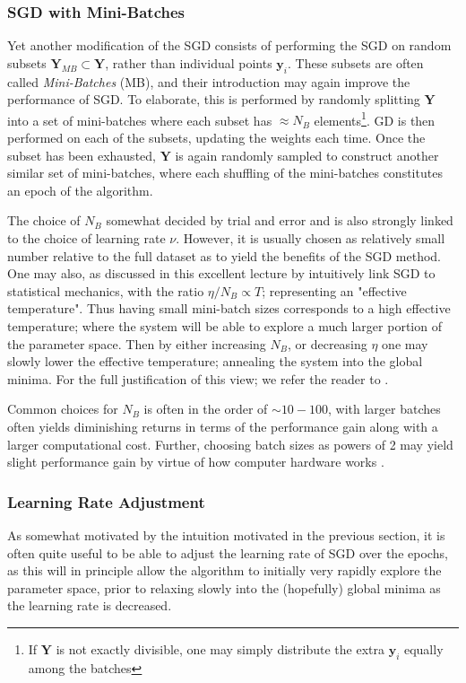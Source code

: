 \documentclass[reprint, english, nofootinbib]{revtex4-2}
\begin{document}
\subsubsection{SGD with Mini-Batches\label{sect: SGD with mini-batches}}
\noindent
Yet another modification of the SGD consists of performing the SGD on random subsets $\pmb Y_{MB} \subset \pmb Y$, rather than individual points $\pmb y_i$. These subsets are often called \textit{Mini-Batches} (MB), and their introduction may again improve the performance of SGD. To elaborate, this is performed by randomly splitting $\pmb Y$ into a set of mini-batches where each subset has $\approx N_{B}$ elements\footnote{If $\pmb Y$ is not exactly divisible, one may simply distribute the extra $\pmb y_i$ equally among the batches}. GD is then performed on each of the subsets, updating the weights each time. Once the subset has been exhausted, $\pmb Y$ is again randomly sampled to construct another similar set of mini-batches, where each shuffling of the mini-batches constitutes an epoch of the algorithm.

The choice of $N_{B}$ somewhat decided by trial and error and is also strongly linked to the choice of learning rate $\nu$. However, it is usually chosen as relatively small number relative to the full dataset as to yield the benefits of the SGD method. One may also, as discussed in this excellent lecture by \textcite{ManyBodyML} intuitively link SGD to statistical mechanics, with the ratio $\eta / N_{B} \propto T$; representing an "effective temperature". Thus having small mini-batch sizes corresponds to a high effective temperature; where the system will be able to explore a much larger portion of the parameter space. Then by either increasing $N_B$, or decreasing $\eta$ one may slowly lower the effective temperature; annealing the system into the global minima. For the full justification of this view; we refer the reader to \textcite{ManyBodyML}.

Common choices for $N_B$ is often in the order of $\sim 10-100$, with larger batches often yields diminishing returns in terms of the performance gain along with a larger computational cost. Further, choosing batch sizes as powers of 2 may yield slight performance gain by virtue of how computer hardware works \cite{Aggarwall}.

\subsubsection{Learning Rate Adjustment}
\noindent
As somewhat motivated by the intuition motivated in the previous section, it is often quite useful to be able to adjust the learning rate of SGD over the epochs, as this will in principle allow the algorithm to initially very rapidly explore the parameter space, prior to relaxing slowly into the (hopefully) global minima as the learning rate is decreased.
\end{document}
